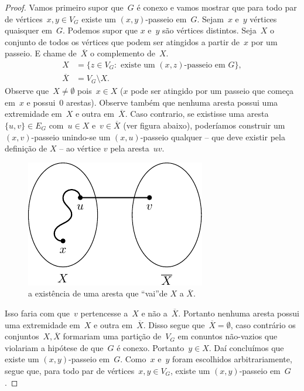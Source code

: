 \documentclass[12pt, a4paper]{article}
\theoremstyle{definition}
\begin{document}
\begin{proof}
Vamos primeiro supor que~$G$ é conexo e vamos mostrar que para todo par de vértices~$x,y \in V_G$ existe um $(x,y)$-passeio em~$G$. Sejam~$x$ e~$y$ vértices quaisquer em~$G$. Podemos supor que $x$ e~$y$ são vértices distintos. Seja~$X$ o conjunto de todos os vértices que podem ser atingidos a partir de~$x$ por um passeio. E chame de~$\overline{X}$ o complemento de~$X$. 
\begin{align*}
  X &= \{z \in V_G \colon \text{~existe um~} (x,z)\text{-passeio em~} G \},\\
    \overline{X} &= V_G \setminus X.
  \end{align*}
  Observe que~$X \neq \emptyset$ pois~$x \in X$ ($x$ pode ser atingido por um passeio que começa em~$x$ e possui~$0$ arestas). Observe também que nenhuma aresta possui uma extremidade em~$X$ e outra em~$\overline{X}$. Caso contrario, se existisse uma aresta~$\{u,v\} \in E_G$ com~$u \in X$ e~$v \in \overline{X}$ (ver figura abaixo), poderíamos construir um $(x,v)$-passeio unindo-se um $(x,u)$-passeio qualquer -- que deve existir pela definição de $X$ -- ao vértice $v$ pela aresta~$uv$.
  \begin{figure}[H]
      \centering
      \includegraphics{path-1}
      \caption{a existência de uma aresta que ``vai''de $X$ a $\overline{X}$.}
      \label{fig:path1}
  \end{figure}
  Isso faria com que~$v$ pertencesse a~$X$ e não a~$\overline{X}$. Portanto nenhuma aresta possui uma extremidade em~$X$ e outra em~$\overline{X}$. Disso segue que~$\overline{X} = \emptyset$,
  caso contrário os conjuntos~$X,\overline{X}$ formariam uma partição de~$V_G$ em conuntos não-vazios que violariam a hipótese de que~$G$ é conexo. Portanto~$y \in X$. Daí concluímos que existe um $(x,y)$-passeio em~$G$. Como~$x$ e~$y$ foram escolhidos arbitrariamente, segue que, para todo par de vértices~$x,y \in V_G$, existe um $(x,y)$-passeio em~$G$.


\end{proof}
\end{document}
